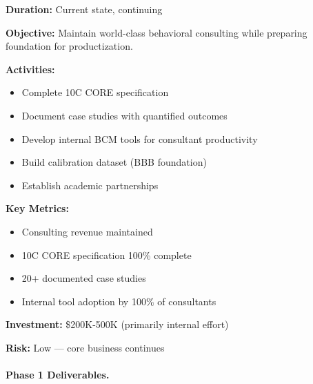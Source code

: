 \begin{tcolorbox}[colback=gray!5!white, colframe=gray!75!black,
    title=Phase 1: Consulting Excellence]

\textbf{Duration:} Current state, continuing

\textbf{Objective:}
Maintain world-class behavioral consulting while preparing foundation for productization.

\textbf{Activities:}
\begin{itemize}[nosep]
\item Complete 10C CORE specification
\item Document case studies with quantified outcomes
\item Develop internal BCM tools for consultant productivity
\item Build calibration dataset (BBB foundation)
\item Establish academic partnerships
\end{itemize}

\textbf{Key Metrics:}
\begin{itemize}[nosep]
\item Consulting revenue maintained
\item 10C CORE specification 100\% complete
\item 20+ documented case studies
\item Internal tool adoption by 100\% of consultants
\end{itemize}

\textbf{Investment:} \$200K-500K (primarily internal effort)

\textbf{Risk:} Low --- core business continues

\end{tcolorbox}

\paragraph{Phase 1 Deliverables.}

